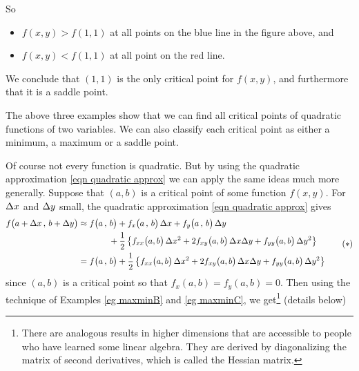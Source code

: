 \begin{eg}[$f(x,y)= x^2-2xy-y^2+4y-2$]
\begin{efig}
\begin{center}
\end{center}
\end{efig}
So 
\begin{itemize}
\item
$f(x,y)>f(1,1)$ at all points on the blue line in the figure above, and
\item 
$f(x,y)<f(1,1)$ at all point on the red line.
\end{itemize}
We conclude that $(1,1)$ is the only critical point for $f(x,y)$,
and furthermore that it is a saddle point.

\end{eg}

The above three examples show that we can find all critical points
of quadratic functions of two variables. We can also classify 
each critical point as either a minimum, a maximum or a
saddle point. 

Of course not every function is quadratic. But by using the 
quadratic approximation \eqref{eqn quadratic approx}
we can apply the same ideas much more generally.
Suppose that $(a,b)$ is a critical point of some function $f(x,y)$. 
For $\Delta x$ and $\Delta y$ small, the
quadratic approximation \eqref{eqn quadratic approx} gives
\begin{equation*}
\begin{split}
f\big(a + \Delta x\,,\,b+\Delta y\big)
&\approx f\big(a\,,\,b\big) 
       + f_x\big(a\,,\,b\big)\,\Delta x
       + f_y\big(a\,,\,b\big)\,\Delta y \\
&\hskip0.5in +\frac{1}{2}\left\{
        f_{xx}\big(a,b\big)\,\Delta x^2
       +2f_{xy}\big(a,b\big) \,\Delta x\Delta y 
       + f_{yy}\big(a,b\big)\,\Delta y^2 \right\}\\
&= f\big(a\,,\,b\big) 
        +\frac{1}{2}\left\{
        f_{xx}\big(a,b\big)\,\Delta x^2
       +2f_{xy}\big(a,b\big) \,\Delta x\Delta y 
       + f_{yy}\big(a,b\big)\,\Delta y^2 \right\}
\end{split}\tag{$*$}
\end{equation*}
since $(a,b)$ is a critical point so that $f_x(a,b)=f_y(a,b)=0$.
Then using the technique of Examples \ref{eg maxminB} and \ref{eg maxminC}, 
we get\footnote{There are analogous results in higher dimensions that are accessible to people who have learned some linear algebra. They
are derived by diagonalizing the matrix of second derivatives, which is 
called the Hessian matrix.
} 
(details below)


